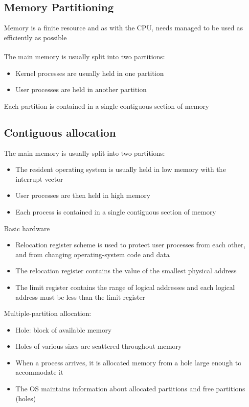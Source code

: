 \documentclass{article}[18pt]
\begin{document}
\subsection{Memory Partitioning}
Memory is a finite resource and as with the CPU, needs managed to be used as efficiently as possible\\
\\
The main memory is usually split into two partitions:
\begin{itemize}
	\item Kernel processes are usually held in one partition
	\item User processes are held in another partition
\end{itemize}
Each partition is contained in a single contiguous section of memory
\subsection{Contiguous allocation}
The main memory is usually split into two partitions:
\begin{itemize}
	\item The resident operating system is usually held in low memory with the interrupt vector
	\item User processes are then held in high memory
	\item Each process is contained in a single contiguous section of memory
\end{itemize}
Basic hardware
\begin{itemize}
	\item Relocation register scheme is used to protect user processes from each other, and from changing operating-system code and data
	\item The relocation register contains the value of the smallest physical address
	\item The limit register contains the range of logical addresses and each logical address must be less than the limit register
\end{itemize}
Multiple-partition allocation:
\begin{itemize}
	\item Hole: block of available memory
	\item Holes of various sizes are scattered throughout memory
	\item When a process arrives, it is allocated memory from a hole large enough to accommodate it
	\item The OS maintains information about allocated partitions and free partitions (holes) 
\end{itemize}
\end{document}
